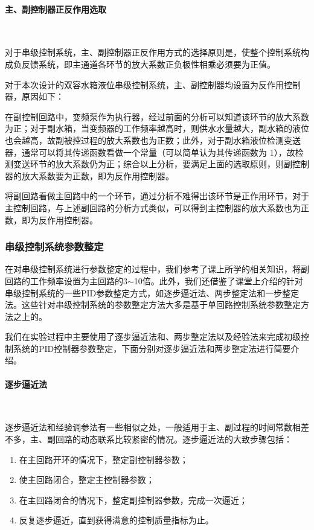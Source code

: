 \documentclass[UTF8]{article}
\begin{document}

\paragraph{主、副控制器正反作用选取}~{}

对于串级控制系统，主、副控制器正反作用方式的选择原则是，使整个控制系统构成负反馈系统，即主通道各环节的放大系数正负极性相乘必须要为正值。

对于本次设计的双容水箱液位串级控制系统，主、副控制器均设置为反作用控制器，原因如下：

在副控制回路中，变频泵作为执行器，经过前面的分析可以知道该环节的放大系数为正；对于副水箱，当变频器的工作频率越高时，则供水水量越大，副水箱的液位也会越高，故副被控过程的放大系数也为正数；此外，对于副水箱液位检测变送器，通常可以将其传递函数看做一个常量（可以简单认为其传递函数为 1），故检测变送环节的放大系数仍为正；综合以上分析，要满足上面的选取原则，则副控制器的放大系数要为正数，即为反作用控制器。

将副回路看做主回路中的一个环节，通过分析不难得出该环节是正作用环节，对于主控制回路，与上述副回路的分析方式类似，可以得到主控制器的放大系数也为正数，即为反作用控制器。


\subsubsection{串级控制系统参数整定}
在对串级控制系统进行参数整定的过程中，我们参考了课上所学的相关知识，将副回路的工作频率设置为主回路的3$\sim$10倍。此外，我们还借鉴了课堂上介绍的针对串级控制系统的一些PID参数整定方式，如逐步逼近法、两步整定法和一步整定法。这些针对串级控制系统的参数整定方法大多是基于单回路控制系统参数整定方法之上的。

我们在实验过程中主要使用了逐步逼近法和、两步整定法以及经验法来完成初级控制系统的PID控制器参数整定，下面分别对逐步逼近法和两步整定法进行简要介绍。

\paragraph{逐步逼近法}~{}

逐步逼近法和经验调参法有一些相似之处，一般适用于主、副过程的时间常数相差不多，主、副回路的动态联系比较紧密的情况。逐步逼近法的大致步骤包括：
\begin{enumerate}
    \item 在主回路开环的情况下，整定副控制器参数；
    \item 使主回路闭合，整定主控制器参数；
    \item 在主回路闭合的情况下，整定副控制器参数，完成一次逼近；
    \item 反复逐步逼近，直到获得满意的控制质量指标为止。
\end{enumerate}
\end{document}
